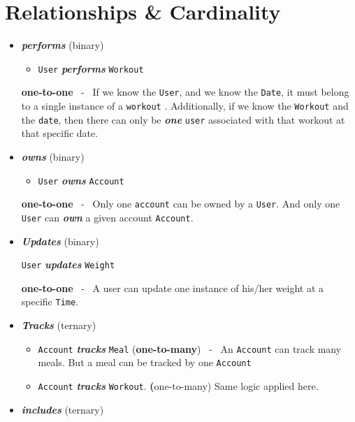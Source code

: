 \documentclass[letterpaper, 11pt]{article}
\newcommand{\1}{\mathds{1}}	%
\theoremstyle{definition}
\begin{document}
        \section{Relationships \& Cardinality}
        \begin{itemize}
            \item \textit{\textbf{performs}} (binary)
            \begin{itemize}
            \item \texttt{User} \textit{\textbf{performs}} \texttt{Workout}
            \end{itemize}
            \textbf{one-to-one} \ - \ If we know the \texttt{User}, and we know the \texttt{Date}, it must belong to a single instance of a \texttt{workout} . Additionally, if we know the \texttt{Workout} and the \texttt{date}, then there can only be \textit{\textbf{one}} \texttt{user} associated with that workout at that specific date.
        \item \textit{\textbf{owns}} (binary)
            \begin{itemize}[label=$\circ$]
            \item \texttt{User} \textit{\textbf{owns}} \texttt{Account}
        \end{itemize}
        \textbf{one-to-one} \ - \ Only one \texttt{account} can be owned by a \texttt{User}. And only one \texttt{User} can \textit{\textbf{own}} a given account \texttt{Account}.
        \item \textit{\textbf{Updates}} (binary)
            \begin{itemize}[label=$\circ$]
                \texttt{User}  \textit{\textbf{updates}} \texttt{Weight}
            \end{itemize}
            \textbf{one-to-one} \ - \ A user can update one instance of his/her weight at a specific \texttt{Time}.
        \item \textit{\textbf{Tracks}} (ternary)
            \begin{itemize}[label=$\circ$]
                \item  \texttt{Account} \textit{\textbf{tracks}} \texttt{Meal} (\textbf{one-to-many}) \ - \ An \texttt{Account} can track many meals. But a meal can be tracked by one \texttt{Account}
                \item \texttt{Account} \textit{\textbf{tracks}} \texttt{Workout}. \textbf(one-to-many) Same logic applied here. 
            \end{itemize}
        \item \textit{\textbf{includes}} (ternary)

\end{itemize}
\end{document}
